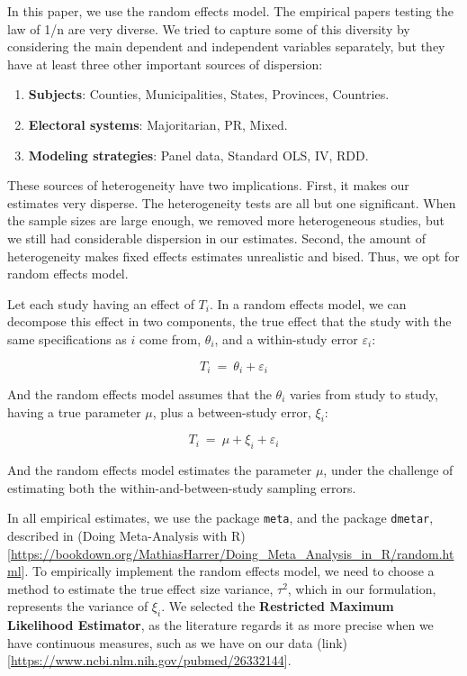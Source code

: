 \documentclass[
]{article}
\providecommand{\tightlist}{%
  \setlength{\itemsep}{0pt}\setlength{\parskip}{0pt}}
\begin{document}
In this paper, we use the random effects model. The empirical papers
testing the law of 1/n are very diverse. We tried to capture some of
this diversity by considering the main dependent and independent
variables separately, but they have at least three other important
sources of dispersion:

\begin{enumerate}
\def\labelenumi{\arabic{enumi}.}
\tightlist
\item
  \textbf{Subjects}: Counties, Municipalities, States, Provinces,
  Countries.
\item
  \textbf{Electoral systems}: Majoritarian, PR, Mixed.
\item
  \textbf{Modeling strategies}: Panel data, Standard OLS, IV, RDD.
\end{enumerate}

These sources of heterogeneity have two implications. First, it makes
our estimates very disperse. The heterogeneity tests are all but one
significant. When the sample sizes are large enough, we removed more
heterogeneous studies, but we still had considerable dispersion in our
estimates. Second, the amount of heterogeneity makes fixed effects
estimates unrealistic and bised. Thus, we opt for random effects model.

Let each study having an effect of \(T_i\). In a random effects model,
we can decompose this effect in two components, the true effect that the
study with the same specifications as \(i\) come from, \(\theta_i\), and
a within-study error \(\varepsilon_i\):

\[
T_i \ = \ \theta_i + \varepsilon_i
\]

And the random effects model assumes that the \(\theta_i\) varies from
study to study, having a true parameter \(\mu\), plus a between-study
error, \(\xi_i\):

\[
T_i \ = \ \mu + \xi_i + \varepsilon_i
\]

And the random effects model estimates the parameter \(\mu\), under the
challenge of estimating both the within-and-between-study sampling
errors.

In all empirical estimates, we use the package \texttt{meta}, and the
package \texttt{dmetar}, described in (Doing Meta-Analysis with
R){[}\url{https://bookdown.org/MathiasHarrer/Doing_Meta_Analysis_in_R/random.html}{]}.
To empirically implement the random effects model, we need to choose a
method to estimate the true effect size variance, \(\tau^2\), which in
our formulation, represents the variance of \(\xi_i\). We selected the
\textbf{Restricted Maximum Likelihood Estimator}, as the literature
regards it as more precise when we have continuous measures, such as we
have on our data
(link){[}\url{https://www.ncbi.nlm.nih.gov/pubmed/26332144}{]}.
\end{document}
